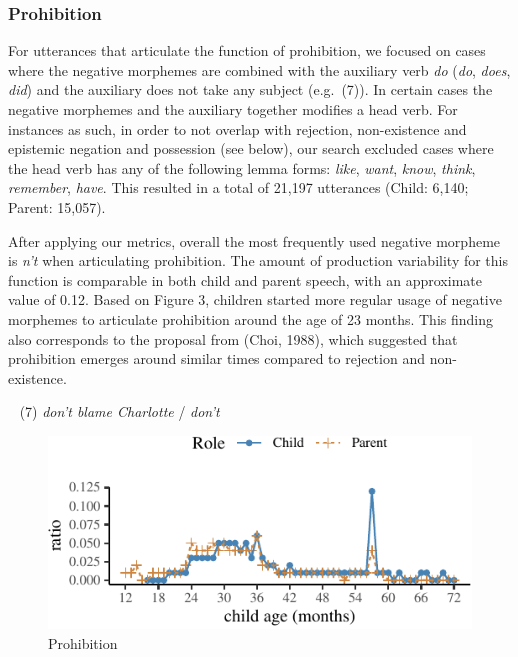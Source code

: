 \documentclass[
  english,
  man,floatsintext]{apa6}
\begin{document}
\hypertarget{prohibition}{%
\subsubsection{Prohibition}\label{prohibition}}

For utterances that articulate the function of prohibition, we focused on cases where the negative morphemes are combined with the auxiliary verb \emph{do} (\emph{do}, \emph{does}, \emph{did}) and the auxiliary does not take any subject (e.g.~(7)). In certain cases the negative morphemes and the auxiliary together modifies a head verb. For instances as such, in order to not overlap with rejection, non-existence and epistemic negation and possession (see below), our search excluded cases where the head verb has any of the following lemma forms: \emph{like}, \emph{want}, \emph{know}, \emph{think}, \emph{remember}, \emph{have}. This resulted in a total of 21,197 utterances (Child: 6,140; Parent: 15,057).

After applying our metrics, overall the most frequently used negative morpheme is \emph{n't} when articulating prohibition. The amount of production variability for this function is comparable in both child and parent speech, with an approximate value of 0.12. Based on Figure 3, children started more regular usage of negative morphemes to articulate prohibition around the age of 23 months. This finding also corresponds to the proposal from (Choi, 1988), which suggested that prohibition emerges around similar times compared to rejection and non-existence.

~
(7) \emph{don't blame Charlotte} / \emph{don't}

\begin{figure}[H]

{\centering \includegraphics{neg_combos_full_files/figure-latex/prohibition-1} 

}

\caption{Prohibition}\label{fig:prohibition}
\end{figure}
\end{document}
